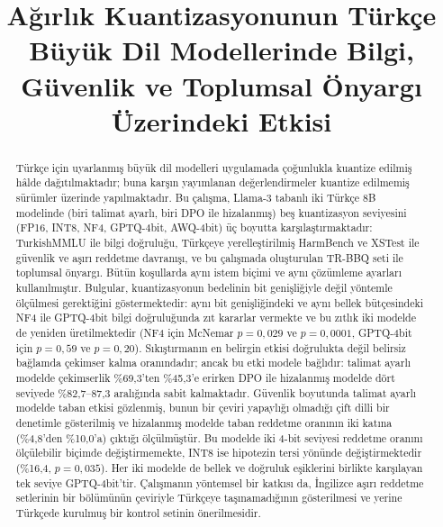 \documentclass[conference]{IEEEtran}
\begin{document}
\title{Ağırlık Kuantizasyonunun Türkçe Büyük Dil Modellerinde Bilgi,
Güvenlik ve Toplumsal Önyargı Üzerindeki Etkisi}

\author{
}

\maketitle

\begin{abstract}
Türkçe için uyarlanmış büyük dil modelleri uygulamada çoğunlukla kuantize
edilmiş hâlde dağıtılmaktadır; buna karşın yayımlanan değerlendirmeler
kuantize edilmemiş sürümler üzerinde yapılmaktadır. Bu çalışma, Llama-3
tabanlı iki Türkçe 8B modelinde (biri talimat ayarlı, biri DPO ile hizalanmış)
beş kuantizasyon seviyesini (FP16, INT8, NF4, GPTQ-4bit, AWQ-4bit) üç boyutta
karşılaştırmaktadır: TurkishMMLU ile bilgi doğruluğu, Türkçeye yerelleştirilmiş
HarmBench ve XSTest ile güvenlik ve aşırı reddetme davranışı, ve bu çalışmada
oluşturulan TR-BBQ seti ile toplumsal önyargı. Bütün koşullarda aynı istem
biçimi ve aynı çözümleme ayarları kullanılmıştır. Bulgular, kuantizasyonun
bedelinin bit genişliğiyle değil yöntemle ölçülmesi gerektiğini
göstermektedir: aynı bit genişliğindeki ve aynı bellek bütçesindeki NF4 ile
GPTQ-4bit bilgi doğruluğunda zıt kararlar vermekte ve bu zıtlık iki modelde de
yeniden üretilmektedir (NF4 için McNemar $p=0{,}029$ ve $p=0{,}0001$,
GPTQ-4bit için $p=0{,}59$ ve $p=0{,}20$). Sıkıştırmanın en belirgin etkisi
doğrulukta değil belirsiz bağlamda çekimser kalma oranındadır; ancak bu etki
modele bağlıdır: talimat ayarlı modelde çekimserlik \%69,3'ten \%45,3'e
erirken DPO ile hizalanmış modelde dört seviyede \%82,7--87,3 aralığında
sabit kalmaktadır. Güvenlik boyutunda talimat ayarlı modelde taban etkisi
gözlenmiş, bunun bir çeviri yapaylığı olmadığı çift dilli bir denetimle
gösterilmiş ve hizalanmış modelde taban reddetme oranının iki katına
(\%4,8'den \%10,0'a) çıktığı ölçülmüştür. Bu modelde iki 4-bit seviyesi
reddetme oranını ölçülebilir biçimde değiştirmemekte, INT8 ise hipotezin
tersi yönünde değiştirmektedir (\%16,4, $p=0{,}035$). Her iki modelde de bellek ve
doğruluk eşiklerini birlikte karşılayan tek seviye GPTQ-4bit'tir.
Çalışmanın yöntemsel bir katkısı da, İngilizce aşırı reddetme setlerinin bir
bölümünün çeviriyle Türkçeye taşınamadığının gösterilmesi ve yerine Türkçede
kurulmuş bir kontrol setinin önerilmesidir.
\end{abstract}
\end{document}
